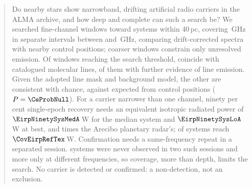 \begin{abstract}
Do nearby stars show narrowband, drifting artificial radio carriers in the
ALMA archive, and how deep and complete can such a search be? We searched
\NWinA{} fine-channel windows toward \NSysClassA{} systems within 40\,pc,
covering \CvUnionA\,GHz in \CovNIslands{} separate intervals between
\SurvFreqLoA{} and \SurvFreqHiA\,GHz, comparing drift-corrected spectra
with nearby control positions; \NWinB{} coarser windows constrain
only unresolved emission. Of \CsNCross{} windows reaching the
search threshold, \MkNCoinc{} coincide with catalogued
molecular lines, \LnAttrSupp{} of them with further evidence of line emission.
Given the adopted line mask and background model, the other \CeObs{} are
consistent with chance, against \CeExp{} expected from control positions
($P=\CeProbNull$). For a carrier narrower than one channel, ninety per cent
single-epoch recovery needs an equivalent isotropic radiated power of
$\EirpNinetySysMedA$\,W for the median system and $\EirpNinetySysLoA$\,W at
best, \AroMedMult{} and \AroDeepMult{} times the Arecibo
planetary radar's; \NSysEfifteen{} of \NSysALimSum{} systems reach
$\CovEirpRefTex$\,W. Confirmation needs a same-frequency repeat in a
separated session. \ZcNoRepNoSep{} systems were never observed in two such
sessions and \ZcNoRepNoFreqWord{} more only at different frequencies, so
coverage, more than depth, limits the search. No carrier is detected or
confirmed: a non-detection, not an exclusion.
\end{abstract}


